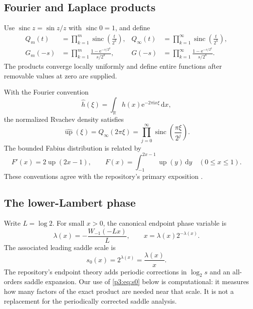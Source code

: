 \documentclass[11pt,oneside]{article}
\numberwithin{equation}{section}
\theoremstyle{definition}
\theoremstyle{remark}
\newcommand{\R}{\mathbb R}
\newcommand{\Up}{\operatorname{up}}
\newcommand{\sinc}{\operatorname{sinc}}
\newcommand{\e}{\mathrm e}
\newcommand{\ii}{\mathrm i}
\newcommand{\dd}{\,\mathrm d}
\begin{document}
\subsection{Fourier and Laplace products}

Use $\sinc z=\sin z/z$ with $\sinc0=1$, and define
\begin{align}
 Q_m(t)&=\prod_{k=1}^{m}\sinc\!\left(\frac{t}{2^k}\right),
 &Q_\infty(t)&=\prod_{k=1}^{\infty}\sinc\!\left(\frac{t}{2^k}\right),
 \label{p3:eq:Qdef}\\
 G_m(-s)&=\prod_{k=1}^{m}\frac{1-\e^{-s/2^k}}{s/2^k},
 &G(-s)&=\prod_{k=1}^{\infty}\frac{1-\e^{-s/2^k}}{s/2^k}.
 \label{p3:eq:Gdef}
\end{align}
The products converge locally uniformly and define entire functions after removable values
at zero are supplied.

With the Fourier convention
\[
 \widehat h(\xi)=\int_{\R}h(x)\e^{-2\pi\ii x\xi}\dd x,
\]
the normalized Rvachev density satisfies
\begin{equation}
 \widehat{\Up}(\xi)=Q_\infty(2\pi\xi)
 =\prod_{j=0}^{\infty}\sinc\!\left(\frac{\pi\xi}{2^j}\right).
 \label{p3:eq:upFourier}
\end{equation}
The bounded Fabius distribution is related by
\begin{equation}
 F'(x)=2\Up(2x-1),\qquad
 F(x)=\int_{-1}^{2x-1}\Up(y)\dd y\quad(0\le x\le1).
 \label{p3:eq:Fup}
\end{equation}
These conventions agree with the repository's primary exposition
\cite{p3:proveit-primary,p3:arias1982}.

\subsection{The lower-Lambert phase}

Write $L=\log2$.  For small $x>0$, the canonical endpoint phase variable is
\begin{equation}
 \lambda(x)=-\frac{W_{-1}(-Lx)}{L},
 \qquad x=\lambda(x)2^{-\lambda(x)}.
 \label{p3:eq:lambda}
\end{equation}
The associated leading saddle scale is
\begin{equation}
 s_0(x)=2^{\lambda(x)}=\frac{\lambda(x)}{x}.
 \label{p3:eq:s0}
\end{equation}
The repository's endpoint theory adds periodic corrections in $\log_2s$ and an all-orders
saddle expansion.  Our use of \eqref{p3:eq:s0} below is computational: it measures how many
factors of the exact product are needed near that scale.  It is not a replacement for the
periodically corrected saddle analysis.
\end{document}
